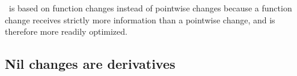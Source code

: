 %

%
%


\ILC\ is based on function changes instead of pointwise changes
because a function
change receives strictly more information than a pointwise
change, and is therefore more readily optimized.

\subsection{Nil changes are derivatives}


